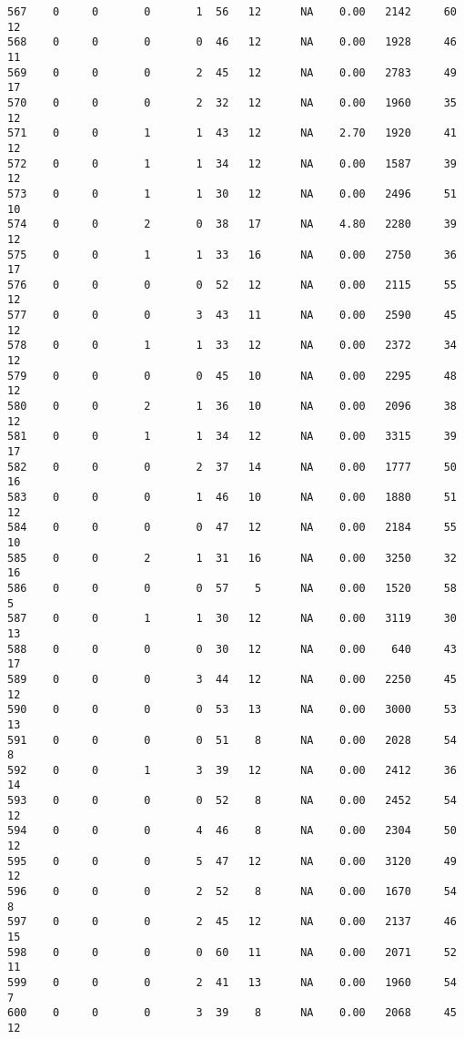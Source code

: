\documentclass[
  letterpaper,
  DIV=11,
  numbers=noendperiod]{scrreprt}
\begin{document}
\begin{verbatim}
567    0     0       0       1  56   12      NA    0.00   2142     60      12
568    0     0       0       0  46   12      NA    0.00   1928     46      11
569    0     0       0       2  45   12      NA    0.00   2783     49      17
570    0     0       0       2  32   12      NA    0.00   1960     35      12
571    0     0       1       1  43   12      NA    2.70   1920     41      12
572    0     0       1       1  34   12      NA    0.00   1587     39      12
573    0     0       1       1  30   12      NA    0.00   2496     51      10
574    0     0       2       0  38   17      NA    4.80   2280     39      12
575    0     0       1       1  33   16      NA    0.00   2750     36      17
576    0     0       0       0  52   12      NA    0.00   2115     55      12
577    0     0       0       3  43   11      NA    0.00   2590     45      12
578    0     0       1       1  33   12      NA    0.00   2372     34      12
579    0     0       0       0  45   10      NA    0.00   2295     48      12
580    0     0       2       1  36   10      NA    0.00   2096     38      12
581    0     0       1       1  34   12      NA    0.00   3315     39      17
582    0     0       0       2  37   14      NA    0.00   1777     50      16
583    0     0       0       1  46   10      NA    0.00   1880     51      12
584    0     0       0       0  47   12      NA    0.00   2184     55      10
585    0     0       2       1  31   16      NA    0.00   3250     32      16
586    0     0       0       0  57    5      NA    0.00   1520     58       5
587    0     0       1       1  30   12      NA    0.00   3119     30      13
588    0     0       0       0  30   12      NA    0.00    640     43      17
589    0     0       0       3  44   12      NA    0.00   2250     45      12
590    0     0       0       0  53   13      NA    0.00   3000     53      13
591    0     0       0       0  51    8      NA    0.00   2028     54       8
592    0     0       1       3  39   12      NA    0.00   2412     36      14
593    0     0       0       0  52    8      NA    0.00   2452     54      12
594    0     0       0       4  46    8      NA    0.00   2304     50      12
595    0     0       0       5  47   12      NA    0.00   3120     49      12
596    0     0       0       2  52    8      NA    0.00   1670     54       8
597    0     0       0       2  45   12      NA    0.00   2137     46      15
598    0     0       0       0  60   11      NA    0.00   2071     52      11
599    0     0       0       2  41   13      NA    0.00   1960     54       7
600    0     0       0       3  39    8      NA    0.00   2068     45      12

\end{verbatim}
\end{document}
